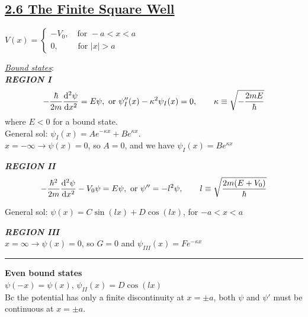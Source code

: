 \subsection{\underline{2.6 The Finite Square Well}}
$V(x) = 
\begin{cases}
    -V_{0}, \quad \textrm{for } -a < x < a &\\
    0, \qquad \textrm{ for } |x| > a &
\end{cases}$



\textit{\underline{Bound states}}: \\

\textbf{\textit{REGION I}}
$$-\frac{\hbar}{2m} \dv[2]{\psi}{x} = E \psi, \textrm{ or } \psi''_{I}(x) - \kappa^2 \psi_{I}(x) = 0, \qquad \kappa \equiv \sqrt{-\frac{2mE}{\hbar}}$$
where $E < 0$ for a bound state. \\
General sol: $\psi_{I}(x) = Ae^{-\kappa x} + B e^{\kappa x}$. \\
$x = -\infty \rightarrow \psi(x) = 0$, so $A = 0$, and we have $\psi_{I}(x) = Be^{\kappa x}$

\smallskip

\textbf{\textit{REGION II}}
$$-\frac{\hbar^2}{2m} \dv[2]{\psi}{x} - V_0 \psi = E \psi, \textrm{ or } \psi'' = -l^2 \psi, \qquad l \equiv \sqrt{\frac{2m (E + V_0)}{\hbar}}$$

General sol: $\psi(x) = C \sin(lx) + D \cos(lx)$, for $-a < x < a$

\smallskip

\textbf{\textit{REGION III}} \\
$x = \infty \rightarrow \psi(x) = 0$, so $G=0$ and $\psi_{III}(x) = Fe^{-\kappa x}$

\medskip
\hrule height 0.3pt \thinspace

\textbf{Even bound states} \\
$\psi(-x) = \psi(x)$, $\psi_{II}(x) = D \cos(lx)$ \\
Bc the potential has only a finite discontinuity at $x = \pm a$, both $\psi$ and $\psi'$ must be continuous at $x = \pm a$.

